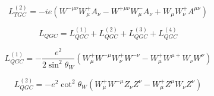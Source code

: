 \begin{equation} \label{eq:L_TGC_2_2}
L_{TGC}^{(2)} = - ie(W^{-\mu\nu}W^+_\mu A_\nu - W^{+\mu\nu}W^-_\mu A_\nu + W_\mu W^+_\nu A^{\mu\nu})
\end{equation}

\begin{equation} \label{eq:L_QGC_2}
L_{QGC} = L_{QGC}^{(1)} + L_{QGC}^{(2)} + L_{QGC}^{(3)} + L_{QGC}^{(4)}
\end{equation}

\begin{equation} \label{eq:L_QGC_2_1}
L_{QGC}^{(1)} = -\frac{e^2}{2\sin^2 \theta_W}(W^+_\mu W^{-\mu}W^+_\nu W^{-\nu} - W^+_\mu W^{\mu +} W_\nu W^{\nu})
\end{equation}

\begin{equation} \label{eq:L_QGC_2_2}
L_{QGC}^{(2)} = - e^2 \cot^2 \theta_W (W^+_\mu W^{-\mu} Z_\nu Z^{\nu} - W^+_\mu Z^{\mu} W_\nu Z^{\nu})
\end{equation}
